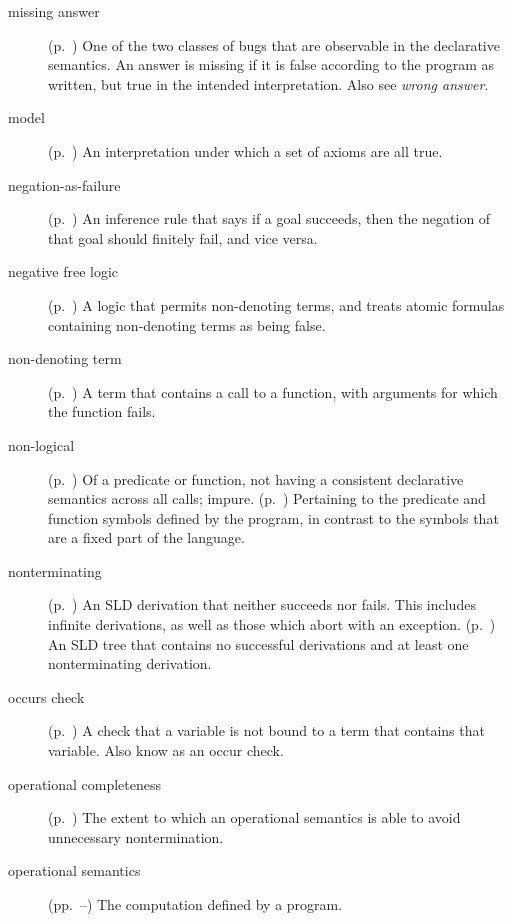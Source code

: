 \begin{description}
\item[missing answer]
(p.~\pageref{gi:missing-answer})
One of the two classes of bugs
that are observable in the declarative semantics.
An answer is missing if it is false according to the program as written,
but true in the intended interpretation.
Also see \emph{wrong answer}.

\item[model]
(p.~\pageref{gi:model})
An interpretation under which a set of axioms are all true.

\item[negation-as-failure]
(p.~\pageref{sec:naf})
An inference rule that says
if a goal succeeds, then the negation of that goal should finitely fail,
and vice versa.

\item[negative free logic]
(p.~\pageref{gi:nfl})
A logic that permits non-denoting terms,
and treats atomic formulas containing non-denoting terms as being false.

\item[non-denoting term]
(p.~\pageref{gi:non-denoting})
A term that contains a call to a  function,
with arguments for which the function fails.

\item[non-logical]
(p.~\pageref{gi:non-logical})
Of a predicate or function,
not having a consistent declarative semantics across all calls; impure.
(p.~\pageref{gi:non-logical2})
Pertaining to the predicate and function symbols defined by the program,
in contrast to the symbols that are a fixed part of the language.

\item[nonterminating]
(p.~\pageref{gi:nontermination})
An SLD derivation that neither succeeds nor fails.
This includes infinite derivations,
as well as those which abort with an exception.
(p.~\pageref{gi:nontermination2})
An SLD tree that contains no successful derivations
and at least one nonterminating derivation.

\item[occurs check]
(p.~\pageref{gi:occurs-check})
A check that a variable is not bound to a term that contains that variable.
Also know as an occur check.

\item[operational completeness]
(p.~\pageref{sec:incompleteness})
The extent to which an operational semantics
is able to avoid unnecessary nontermination.

\item[operational semantics]
(pp.~\pageref{sec:op-sem}--\pageref{end:op-sem})
The computation defined by a program.


\end{description}
